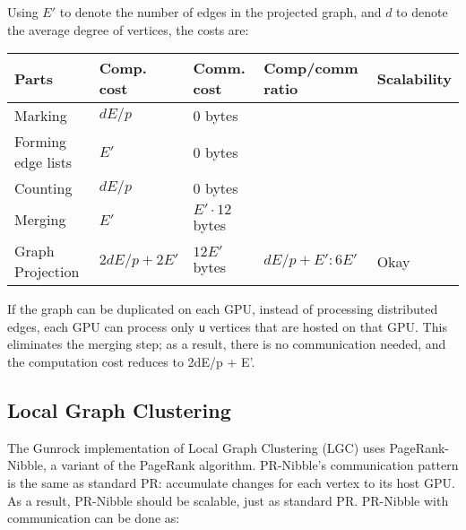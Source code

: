 \documentclass[10pt,oneside]{memoir}
\begin{document}
Using \(E'\) to denote the number of edges in the projected graph, and
\(d\) to denote the average degree of vertices, the costs are:

\begin{longtable}[]{@{}lllll@{}}
\toprule
Parts & Comp. cost & Comm. cost & Comp/comm ratio &
Scalability\tabularnewline
\midrule
\endhead
Marking & \(dE/p\) & \(0\) bytes & &\tabularnewline
Forming edge lists & \(E'\) & \(0\) bytes & &\tabularnewline
Counting & \(dE/p\) & \(0\) bytes & &\tabularnewline
Merging & \(E'\) & \(E' \cdot 12\) bytes & &\tabularnewline
Graph Projection & \(2dE/p + 2E'\) & \(12E'\) bytes &
\(dE/p + E' : 6E'\) & Okay\tabularnewline
\bottomrule
\end{longtable}

If the graph can be duplicated on each GPU, instead of processing
distributed edges, each GPU can process only \texttt{u} vertices that
are hosted on that GPU. This eliminates the merging step; as a result,
there is no communication needed, and the computation cost reduces to
2dE/p + E'.

\hypertarget{local-graph-clustering}{%
\subsection{Local Graph Clustering}\label{local-graph-clustering}}

The Gunrock implementation of Local Graph Clustering (LGC) uses
PageRank-Nibble, a variant of the PageRank algorithm. PR-Nibble's
communication pattern is the same as standard PR: accumulate changes for
each vertex to its host GPU. As a result, PR-Nibble should be scalable,
just as standard PR. PR-Nibble with communication can be done as:
\end{document}
